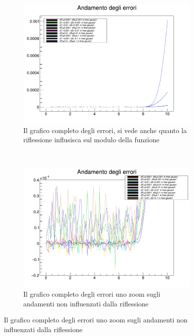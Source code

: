 \begin{figure}[ht]
\centering
\begin{subfigure}[b]{0.49\textwidth}
\includegraphics[width=\linewidth]{IMG/e_g1full}
\caption[Errori completo]{Il grafico completo degli errori, si vede anche quanto la riflessione influsisca sul modulo della funzione}\label{fig:fullErr}
\end{subfigure}
~
\begin{subfigure}[b]{0.49\textwidth}
	\includegraphics[width=\linewidth]{IMG/e_g1res}
	\caption[Errori zoom]{Il grafico completo degli errori uno zoom sugli andamenti non influenzati dalla riflessione}\label{fig:fullErrzoom}
\end{subfigure}
\end{figure}

